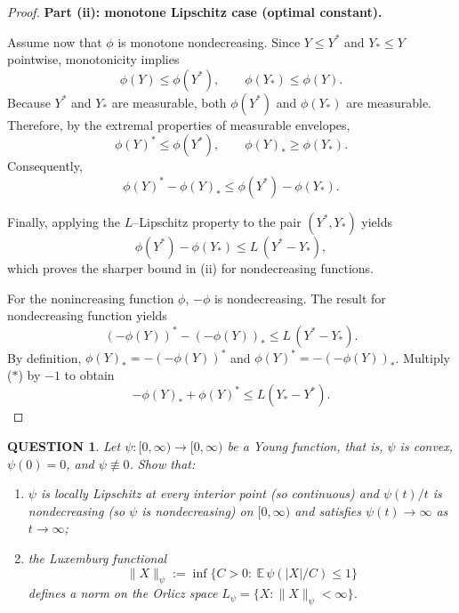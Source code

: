 \documentclass[12pt]{article}
\renewcommand{\(}{\left(}%
\renewcommand{\)}{\right)}%
\renewcommand{\[}{\left[}%
\renewcommand{\]}{\right]}%
\newtheorem{question}{QUESTION}[section]}
\newtheorem{proof}{Proof.}}
\begin{document}
\begin{proof}
\medskip
\noindent
\textbf{Part (ii): monotone Lipschitz case (optimal constant).}

Assume now that $\phi$ is monotone nondecreasing.
Since $Y\le Y^*$ and $Y_*\le Y$ pointwise, monotonicity implies
\begin{equation*}
\phi(Y) \le \phi(Y^*),
\qquad
\phi(Y_*) \le \phi(Y).
\end{equation*}
Because $Y^*$ and $Y_*$ are measurable, both $\phi(Y^*)$ and $\phi(Y_*)$ are measurable.
Therefore, by the extremal properties of measurable envelopes,
\begin{equation*}
\phi(Y)^* \le \phi(Y^*),
\qquad
\phi(Y)_* \ge \phi(Y_*).
\end{equation*}
Consequently,
\begin{equation*}
\phi(Y)^* - \phi(Y)_*
\le
\phi(Y^*) - \phi(Y_*).
\end{equation*}

Finally, applying the $L$--Lipschitz property to the pair $(Y^*,Y_*)$ yields
\begin{equation*}
\phi(Y^*) - \phi(Y_*)
\le
L\,(Y^*-Y_*),
\end{equation*}
which proves the sharper bound in (ii) for nondecreasing functions. 

For the nonincreasing function $\phi$, $-\phi$ is nondecreasing. The result for nondecreasing function yields
\begin{equation*}
	(-\phi(Y))^* - (-\phi(Y))_*
\le L\,(Y^*-Y_*). \tag{$*$}
\end{equation*}
By definition, $\phi(Y)_*=-(-\phi(Y))^*$ and $\phi(Y)^*=-(-\phi(Y))_*$. Multiply ($*$) by $-1$ to obtain
\begin{equation*}
	-\phi(Y)_*+\phi(Y)^*\le L(Y_*-Y^*).
\end{equation*}
\end{proof}

\begin{question}
Let $\psi:[0,\infty)\to[0,\infty)$ be a Young function, that is,
$\psi$ is convex, $\psi(0)=0$, and $\psi\not\equiv 0$.
Show that:
\begin{enumerate}
\item $\psi$ is locally Lipschitz at every interior point (so continuous) and $\psi(t)/t$ is nondecreasing (so $\psi$ is nondecreasing) on $[0,\infty)$ and satisfies $\psi(t)\to\infty$ as $t\to\infty$;
\item the Luxemburg functional
\begin{equation*}
	\|X\|_\psi
:=
\inf\Big\{C>0:\ \mathbb E\,\psi(|X|/C)\le 1\Big\}
\end{equation*}
defines a norm on the Orlicz space $L_\psi=\{X:\|X\|_\psi<\infty\}$.
\end{enumerate}
\end{question}
\end{document}
